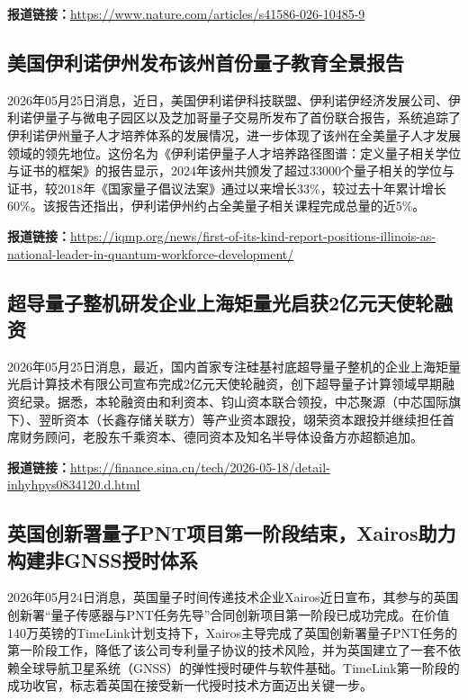 \documentclass[12pt,a4paper]{ctexart}
\begin{document}
\noindent\textbf{报道链接：}\url{https://www.nature.com/articles/s41586-026-10485-9}

\subsection{ 美国伊利诺伊州发布该州首份量子教育全景报告 }

2026年05月25日消息，近日，美国伊利诺伊科技联盟、伊利诺伊经济发展公司、伊利诺伊量子与微电子园区以及芝加哥量子交易所发布了首份联合报告，系统追踪了伊利诺伊州量子人才培养体系的发展情况，进一步体现了该州在全美量子人才发展领域的领先地位。这份名为《伊利诺伊量子人才培养路径图谱：定义量子相关学位与证书的框架》的报告显示，2024年该州共颁发了超过33000个量子相关的学位与证书，较2018年《国家量子倡议法案》通过以来增长33\%，较过去十年累计增长60\%。该报告还指出，伊利诺伊州约占全美量子相关课程完成总量的近5\%。

\noindent\textbf{报道链接：}\url{https://iqmp.org/news/first-of-its-kind-report-positions-illinois-as-national-leader-in-quantum-workforce-development/}

\subsection{ 超导量子整机研发企业上海矩量光启获2亿元天使轮融资 }

2026年05月25日消息，最近，国内首家专注硅基衬底超导量子整机的企业上海矩量光启计算技术有限公司宣布完成2亿元天使轮融资，创下超导量子计算领域早期融资纪录。据悉，本轮融资由和利资本、钧山资本联合领投，中芯聚源（中芯国际旗下）、翌昕资本（长鑫存储关联方）等产业资本跟投，翊荣资本跟投并继续担任首席财务顾问，老股东千乘资本、德同资本及知名半导体设备方亦超额追加。

\noindent\textbf{报道链接：}\url{https://finance.sina.cn/tech/2026-05-18/detail-inhyhpys0834120.d.html}

\subsection{ 英国创新署量子PNT项目第一阶段结束，Xairos助力构建非GNSS授时体系 }

2026年05月24日消息，英国量子时间传递技术企业Xairos近日宣布，其参与的英国创新署“量子传感器与PNT任务先导”合同创新项目第一阶段已成功完成。在价值140万英镑的TimeLink计划支持下，Xairos主导完成了英国创新署量子PNT任务的第一阶段工作，降低了该公司专利量子协议的技术风险，并为英国建立了一套不依赖全球导航卫星系统（GNSS）的弹性授时硬件与软件基础。TimeLink第一阶段的成功收官，标志着英国在接受新一代授时技术方面迈出关键一步。
\end{document}
